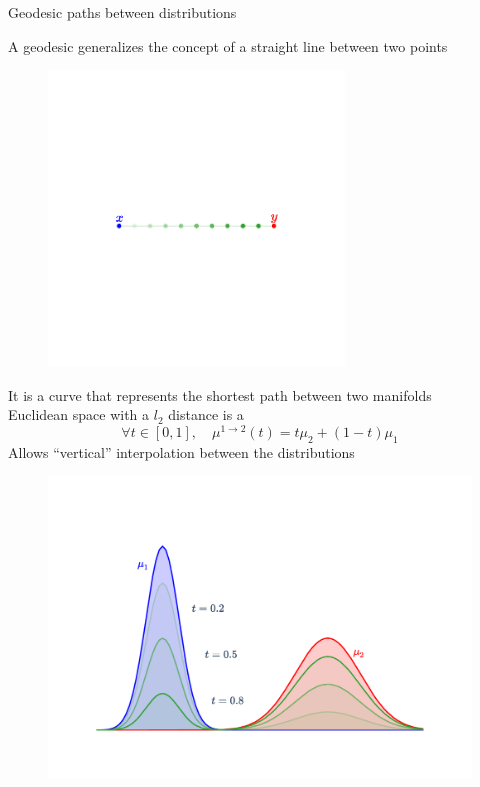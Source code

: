 \documentclass[pdf,aspectratio=169,10pt]{beamer}
\begin{document}
\begin{frame}{Geodesic paths between distributions}
    \begin{minipage}{0.59\textwidth}
    A geodesic generalizes the concept of a straight line between two points\\
    \begin{figure}
        \centering
            \includegraphics[trim={2cm 4.5cm 2cm 5cm},clip, width=0.7\textwidth]{../img/straightLine.pdf}
        \end{figure}

    It is a curve that represents the shortest path between two manifolds\\
    Euclidean space with a $l_2$ distance is a \\
    \begin{equation*}
        \forall t \in [0,1],\quad \mu^{1\to 2}(t) = t\mu_2 + (1-t) \mu_1
    \end{equation*} 
    Allows ``vertical'' interpolation between the distributions
\end{minipage}
\hfill
\begin{minipage}{0.4\textwidth}

        \begin{figure}
            \centering
                \includegraphics[trim={2cm 2cm 2cm 2cm},clip, width=1\textwidth]{../img/geodesic_Euc_1d.pdf}
            \end{figure}
\end{minipage}


\end{frame}
\end{document}
